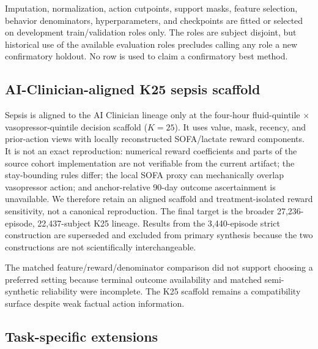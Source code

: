 \documentclass[sigconf,review]{acmart}
\begin{document}
Imputation, normalization, action cutpoints, support masks, feature selection, behavior denominators, hyperparameters, and checkpoints are fitted or selected on development train/validation roles only. The roles are subject disjoint, but historical use of the available evaluation roles precludes calling any role a new confirmatory holdout. No row is used to claim a confirmatory best method.

\subsection{AI-Clinician-aligned K25 sepsis scaffold}

Sepsis is aligned to the AI Clinician lineage only at the four-hour fluid-quintile $\times$ vasopressor-quintile decision scaffold ($K=25$). It uses value, mask, recency, and prior-action views with locally reconstructed SOFA/lactate reward components. It is not an exact reproduction: numerical reward coefficients and parts of the source cohort implementation are not verifiable from the current artifact; the stay-bounding rules differ; the local SOFA proxy can mechanically overlap vasopressor action; and anchor-relative 90-day outcome ascertainment is unavailable. We therefore retain an aligned scaffold and treatment-isolated reward sensitivity, not a canonical reproduction. The final target is the broader 27,236-episode, 22,437-subject K25 lineage. Results from the 3,440-episode strict construction are superseded and excluded from primary synthesis because the two constructions are not scientifically interchangeable.

The matched feature/reward/denominator comparison did not support choosing a preferred setting because terminal outcome availability and matched semi-synthetic reliability were incomplete. The K25 scaffold remains a compatibility surface despite weak factual action information.

\subsection{Task-specific extensions}
\end{document}
